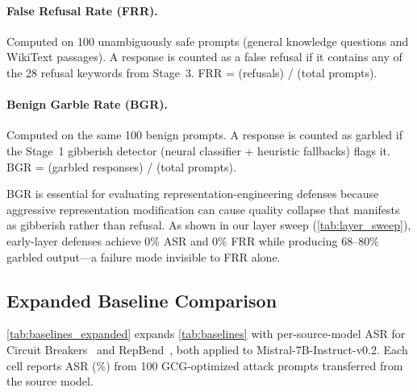 \paragraph{False Refusal Rate (FRR).}
Computed on 100 unambiguously safe prompts (general knowledge questions and WikiText passages). A response is counted as a false refusal if it contains any of the 28 refusal keywords from Stage~3. FRR = (refusals) / (total prompts).

\paragraph{Benign Garble Rate (BGR).}
Computed on the same 100 benign prompts. A response is counted as garbled if the Stage~1 gibberish detector (neural classifier + heuristic fallbacks) flags it. BGR = (garbled responses) / (total prompts).

BGR is essential for evaluating representation-engineering defenses because aggressive representation modification can cause quality collapse that manifests as gibberish rather than refusal. As shown in our layer sweep (\cref{tab:layer_sweep}), early-layer defenses achieve 0\% ASR and 0\% FRR while producing 68--80\% garbled output---a failure mode invisible to FRR alone.

\subsection{Expanded Baseline Comparison}
\label{app:baselines}

\cref{tab:baselines_expanded} expands \cref{tab:baselines} with per-source-model ASR for Circuit Breakers~\citep{zou2024circuitbreakers} and RepBend~\citep{repbend}, both applied to Mistral-7B-Instruct-v0.2. Each cell reports ASR (\%) from 100 GCG-optimized attack prompts transferred from the source model.


